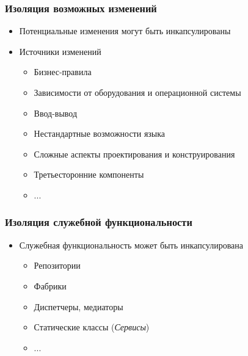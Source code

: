\documentclass[xetex,mathserif,serif]{beamer}
\begin{document}
	\begin{frame}
		\frametitle{Изоляция возможных изменений}
		\begin{itemize}
			\item Потенциальные изменения могут быть инкапсулированы
			\item Источники изменений
			\begin{itemize}
				\item Бизнес-правила
				\item Зависимости от оборудования и операционной системы
				\item Ввод-вывод
				\item Нестандартные возможности языка
				\item Сложные аспекты проектирования и конструирования
				\item Третьесторонние компоненты
				\item ...
			\end{itemize}
		\end{itemize}
	\end{frame}

	\begin{frame}
		\frametitle{Изоляция служебной функциональности}
		\begin{itemize}
			\item Служебная функциональность может быть инкапсулирована
			\begin{itemize}
				\item Репозитории
				\item Фабрики
				\item Диспетчеры, медиаторы
				\item Статические классы (\textit{Сервисы})
				\item ...
			\end{itemize}
		\end{itemize}
	\end{frame}
\end{document}
